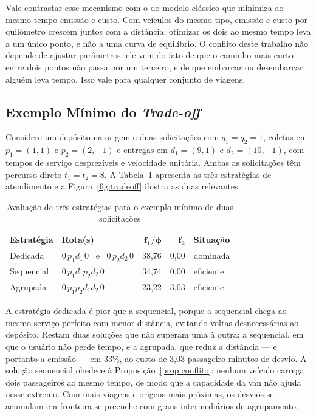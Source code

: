 \documentclass[12pt,a4paper]{article}
\theoremstyle{plain}
\begin{document}
Vale contrastar esse mecanismo com o do modelo clássico que minimiza ao mesmo tempo emissão e custo. Com veículos do mesmo tipo, emissão e custo por quilômetro crescem juntos com a distância; otimizar os dois ao mesmo tempo leva a um único ponto, e não a uma curva de equilíbrio. O conflito deste trabalho não depende de ajustar parâmetros: ele vem do fato de que o caminho mais curto entre dois pontos não passa por um terceiro, e de que embarcar ou desembarcar alguém leva tempo. Isso vale para qualquer conjunto de viagens.

\subsection{Exemplo Mínimo do \textit{Trade-off}}
\label{sec:exemplo}

Considere um depósito na origem e duas solicitações com $q_1 = q_2 = 1$, coletas em $p_1 = (1,1)$ e $p_2 = (2,-1)$ e entregas em $d_1 = (9,1)$ e $d_2 = (10,-1)$, com tempos de serviço desprezíveis e velocidade unitária. Ambas as solicitações têm percurso direto $\bar{t}_1 = \bar{t}_2 = 8$. A Tabela~\ref{tab:exemplo} apresenta as três estratégias de atendimento e a Figura~\ref{fig:tradeoff} ilustra as duas relevantes.

\begin{table}[htbp]
\centering
\caption{Avaliação de três estratégias para o exemplo mínimo de duas solicitações}
\label{tab:exemplo}
\begin{tabular}{@{}llrrl@{}}
\toprule
\textbf{Estratégia} & \textbf{Rota(s)} & $\boldsymbol{f_1/\phi}$ & $\boldsymbol{f_2}$ & \textbf{Situação} \\
\midrule
Dedicada    & $0\,p_1 d_1\,0$ \ e \ $0\,p_2 d_2\,0$ & 38,76 & 0,00 & dominada \\
Sequencial  & $0\,p_1 d_1 p_2 d_2\,0$               & 34,74 & 0,00 & eficiente \\
Agrupada    & $0\,p_1 p_2 d_1 d_2\,0$               & 23,22 & 3,03 & eficiente \\
\bottomrule
\end{tabular}
\end{table}

A estratégia dedicada é pior que a sequencial, porque a sequencial chega ao mesmo serviço perfeito com menor distância, evitando voltas desnecessárias ao depósito. Restam duas soluções que não superam uma à outra: a sequencial, em que o usuário não perde tempo, e a agrupada, que reduz a distância --- e portanto a emissão --- em 33\%, ao custo de 3,03 passageiro-minutos de desvio. A solução sequencial obedece à Proposição~\ref{prop:conflito}: nenhum veículo carrega dois passageiros ao mesmo tempo, de modo que a capacidade da van não ajuda nesse extremo. Com mais viagens e origens mais próximas, os desvios se acumulam e a fronteira se preenche com graus intermediários de agrupamento.
\end{document}
